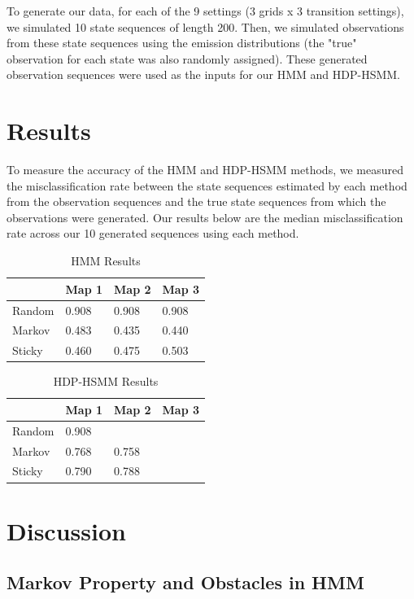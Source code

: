 \documentclass{article}
\begin{document}
To generate our data, for each of the 9 settings (3 grids x 3 transition settings), we simulated 10 state sequences of length 200. Then, we simulated observations from these state sequences using the emission distributions (the "true" observation for each state was also randomly assigned). These generated observation sequences were used as the inputs for our HMM and HDP-HSMM.

\section{Results}

To measure the accuracy of the HMM and HDP-HSMM methods, we measured the misclassification rate between the state sequences estimated by each method from the observation sequences and the true state sequences from which the observations were generated. Our results below are the median misclassification rate across our 10 generated sequences using each method.

\begin{table}[H]
	\centering
	\begin{tabular}{|l|l|l|l|}
	\hline
	& Map 1 & Map 2 & Map 3 \\
	\hline
	Random	& 0.908 & 0.908 & 0.908  \\
	\hline
	Markov & 0.483 & 0.435 & 0.440 \\
	\hline
	Sticky & 0.460 & 0.475& 0.503 \\
	\hline
	\end{tabular}
	\caption{HMM Results}
\end{table}

\begin{table}[H]
	\centering
	\begin{tabular}{|l|l|l|l|}
		\hline
		& Map 1 & Map 2 & Map 3 \\
		\hline
		Random	& 0.908 &  &   \\
		\hline
		Markov & 0.768 & 0.758 &  \\
		\hline
		Sticky & 0.790 & 0.788 &  \\
		\hline
	\end{tabular}
	\caption{HDP-HSMM Results}
\end{table}

\section{Discussion}

\subsection{Markov Property and Obstacles in HMM}
\end{document}
